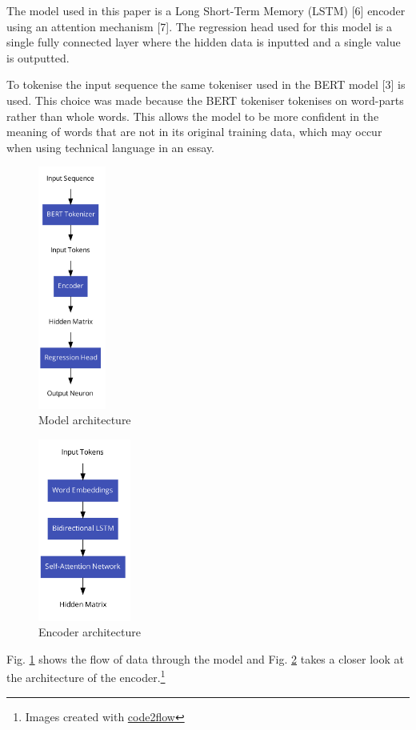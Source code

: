 The model used in this paper is a Long Short-Term Memory (LSTM) {[}6{]}
encoder using an attention mechanism {[}7{]}. The regression head used
for this model is a single fully connected layer where the hidden data
is inputted and a single value is outputted.

To tokenise the input sequence the same tokeniser used in the BERT model
{[}3{]} is used. This choice was made because the BERT tokeniser
tokenises on word-parts rather than whole words. This allows the model
to be more confident in the meaning of words that are not in its
original training data, which may occur when using technical language in
an essay.

\begin{figure}[h!]
\centering
\includegraphics[height=8cm]{../model-basic}
\caption{Model architecture}
\label{fig:arch}
\end{figure}

\begin{figure}[h!]
\centering
\includegraphics[height=6cm]{../encoder}
\caption{Encoder architecture}
\label{fig:encoder}
\end{figure}

Fig. \ref{fig:arch} shows the flow of data through the model and Fig.
\ref{fig:encoder} takes a closer look at the architecture of the
encoder.\footnote{Images created with
  \href{https://code2flow.com}{code2flow}}

